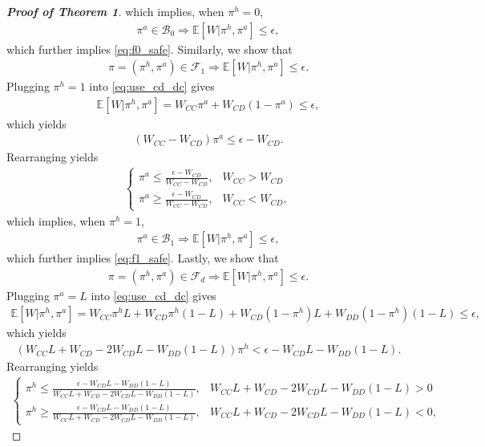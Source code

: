 \documentclass[letterpaper]{article} %
\begin{document}
\begin{proof}[\textbf{Proof of Theorem 1}]
which implies, when $\pi^h=0$,
\begin{align}
    \pi^a\in\mathcal{B}_0\Rightarrow\mathbb{E}[W|\pi^h,\pi^a]\leq\epsilon,
\end{align}
which further implies \eqref{eq:f0_safe}. Similarly, we show that
\begin{align}
\label{eq:f1_safe}
    \pi=(\pi^h,\pi^a)\in\mathcal{F}_1\Rightarrow\mathbb{E}[W|\pi^h,\pi^a]\leq\epsilon.
\end{align}
Plugging $\pi^h=1$ into \eqref{eq:use_cd_dc} gives
\begin{align}
    \mathbb{E}[W|\pi^h,\pi^a]=W_{CC}\pi^a+W_{CD}(1-\pi^a)\leq\epsilon,
\end{align}
which yields
\begin{align}
    (W_{CC}-W_{CD})\pi^a\leq\epsilon-W_{CD}.
\end{align}
Rearranging yields
\begin{align}
    \begin{cases}
        \pi^a\leq\frac{\epsilon-W_{CD}}{W_{CC}-W_{CD}}, & W_{CC}>W_{CD} \\ 
        \pi^a\geq\frac{\epsilon-W_{CD}}{W_{CC}-W_{CD}}, & W_{CC}<W_{CD},
    \end{cases}
\end{align}
which implies, when $\pi^h=1$,
\begin{align}
    \pi^a\in\mathcal{B}_1\Rightarrow\mathbb{E}[W|\pi^h,\pi^a]\leq\epsilon,
\end{align}
which further implies \eqref{eq:f1_safe}. Lastly, we show that
\begin{align}
\label{eq:fd_safe}
    \pi=(\pi^h,\pi^a)\in\mathcal{F}_d\Rightarrow\mathbb{E}[W|\pi^h,\pi^a]\leq\epsilon.
\end{align}
Plugging $\pi^a=L$ into \eqref{eq:use_cd_dc} gives
\begin{align}
    \mathbb{E}[W|\pi^h,\pi^a]=W_{CC}\pi^hL+W_{CD}\pi^h(1-L)+W_{CD}(1-\pi^h)L+W_{DD}(1-\pi^h)(1-L)\leq\epsilon,
\end{align}
which yields
\begin{align}
    (W_{CC}L+W_{CD}-2W_{CD}L-W_{DD}(1-L))\pi^h<\epsilon-W_{CD}L-W_{DD}(1-L).
\end{align}
Rearranging yields
\begin{align}
    \begin{cases}
        \pi^h\leq\frac{\epsilon-W_{CD}L-W_{DD}(1-L)}{W_{CC}L+W_{CD}-2W_{CD}L-W_{DD}(1-L)}, & W_{CC}L+W_{CD}-2W_{CD}L-W_{DD}(1-L)>0 \\
        \pi^h\geq\frac{\epsilon-W_{CD}L-W_{DD}(1-L)}{W_{CC}L+W_{CD}-2W_{CD}L-W_{DD}(1-L)}, & W_{CC}L+W_{CD}-2W_{CD}L-W_{DD}(1-L)<0,

\end{cases}
\end{align}
\end{proof}
\end{document}
